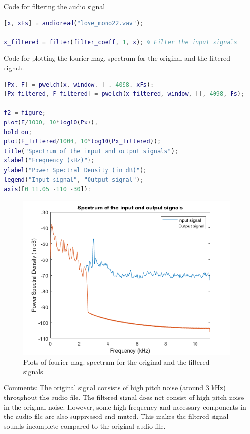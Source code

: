 \documentclass{article}
\begin{document}
Code for filtering the audio signal
\begin{lstlisting}[language=Matlab]
[x, xFs] = audioread("love_mono22.wav");

x_filtered = filter(filter_coeff, 1, x); % Filter the input signals
\end{lstlisting}

Code for plotting the fourier mag. spectrum for the original and the filtered signals
\begin{lstlisting}[language=Matlab]
% Power Spectral Density of the input signal and output signal
[Px, F] = pwelch(x, window, [], 4098, xFs);
[Px_filtered, F_filtered] = pwelch(x_filtered, window, [], 4098, Fs);

f2 = figure;
plot(F/1000, 10*log10(Px));
hold on;
plot(F_filtered/1000, 10*log10(Px_filtered));
title("Spectrum of the input and output signals");
xlabel("Frequency (kHz)");
ylabel("Power Spectral Density (in dB)");
legend("Input signal", "Output signal");
axis([0 11.05 -110 -30]);
\end{lstlisting}

\begin{figure}[h!]
\includegraphics[width=\textwidth]{LPFresult.png}
\caption{Plots of fourier mag. spectrum for the original and the filtered signals}
\end{figure}

Comments: The original signal consists of high pitch noise (around 3 kHz) throughout the audio file. The filtered signal does not consist of high pitch noise in the original noise. However, some high frequency and necessary components in the audio file are also suppressed and muted. This makes the filtered signal sounds incomplete compared to the original audio file.
\end{document}
